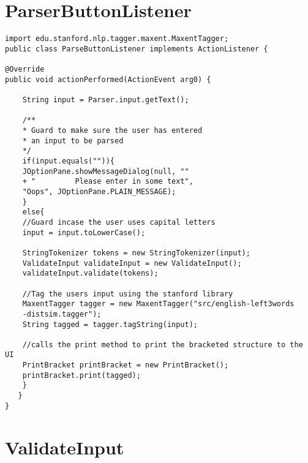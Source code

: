 \section{ParserButtonListener}

\begin{lstlisting}
import edu.stanford.nlp.tagger.maxent.MaxentTagger;
public class ParseButtonListener implements ActionListener {

@Override
public void actionPerformed(ActionEvent arg0) {
	
	String input = Parser.input.getText();
	
	/**
	* Guard to make sure the user has entered 
	* an input to be parsed
	*/
	if(input.equals("")){
	JOptionPane.showMessageDialog(null, ""
	+ "			Please enter in some text", 
	"Oops", JOptionPane.PLAIN_MESSAGE);
	}
	else{
	//Guard incase the user uses capital letters
	input = input.toLowerCase();
	
	StringTokenizer tokens = new StringTokenizer(input);
	ValidateInput validateInput = new ValidateInput();
	validateInput.validate(tokens);
	
	//Tag the users input using the stanford library
	MaxentTagger tagger = new MaxentTagger("src/english-left3words
	-distsim.tagger");			
	String tagged = tagger.tagString(input);
	
	//calls the print method to print the bracketed structure to the UI
	PrintBracket printBracket = new PrintBracket();
	printBracket.print(tagged);
	}		
   }
}

\end{lstlisting}

\section{ValidateInput}

